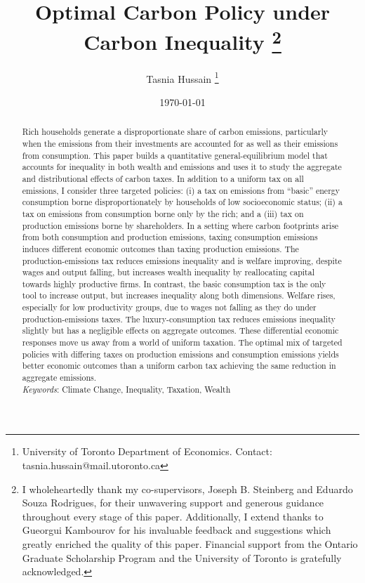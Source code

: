 \documentclass[12pt,a4paper]{article}
\author{Tasnia Hussain \thanks{University of Toronto Department of Economics. Contact: tasnia.hussain@mail.utoronto.ca}}
\title{Optimal Carbon Policy under Carbon Inequality \thanks{I wholeheartedly thank my co-supervisors, Joseph B. Steinberg and Eduardo Souza Rodrigues, for their unwavering support and generous guidance throughout every stage of this paper. Additionally, I extend thanks to Gueorgui Kambourov for his invaluable feedback and suggestions which greatly enriched the quality of this paper.  Financial support from the Ontario Graduate Scholarship Program and the University of Toronto is gratefully acknowledged. }}
\date{\monthyeardate \today}
\begin{document}
\maketitle

\begin{abstract}
 
\hspace*{6mm} Rich households generate a disproportionate share of carbon emissions, particularly when the emissions from their investments are accounted for as well as their emissions from  consumption. This paper builds a quantitative general-equilibrium model that accounts for inequality in both wealth and emissions and uses it to study the aggregate and distributional effects of carbon taxes. In addition to a uniform tax on all emissions, I consider three targeted policies: (i) a tax on emissions from “basic” energy consumption borne disproportionately by households of low socioeconomic status; (ii) a tax on emissions from consumption borne only by the rich; and a (iii) tax on production emissions borne by shareholders. In a setting where carbon footprints arise from both consumption and production emissions, taxing consumption emissions induces different economic outcomes than taxing production emissions. The production-emissions tax reduces emissions inequality and is welfare improving, despite wages and output falling, but increases wealth inequality by reallocating capital towards highly productive firms. In contrast, the basic consumption tax is the only tool to increase output, but increases inequality along both dimensions. Welfare rises, especially for low productivity groups, due to wages not falling as they do under production-emissions taxes. The luxury-consumption tax reduces emissions inequality slightly but has a negligible effects on aggregate outcomes. These differential economic responses move us away from a world of uniform taxation. The optimal mix of targeted policies with differing taxes on production emissions and consumption emissions yields better economic outcomes than a uniform carbon tax achieving the same reduction in aggregate emissions. 
    \\
		
		
		
		\textit{Keywords}: Climate Change, Inequality, Taxation, Wealth
	
		\pagebreak
	

	\end{abstract}
\end{document}
